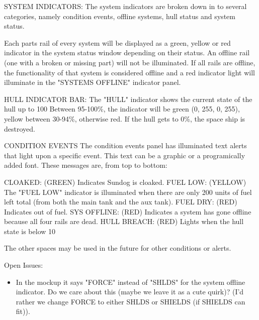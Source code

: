 \begin{itemize}
SYSTEM INDICATORS: 
The system indicators are broken down in to several categories, namely
condition events, offline systems, hull status and system status.

Each parts rail of every system will be displayed as a green, yellow or red
indicator in the system status window depending on their status.  An
offline rail (one with a broken or missing part) will not be illuminated.
If all rails are offline, the functionality of that system is considered
offline and a red indicator light will illuminate in the "SYSTEMS OFFLINE"
indicator panel.

HULL INDICATOR BAR:
The "HULL" indicator shows the current state of the hull up to 100%
Between 95-100\%, the indicator will be green (0, 255, 0, 255),
yellow between 30-94\%, otherwise red.  If the hull gets to 0\%, the
space ship is destroyed.  

CONDITION EVENTS
The condition events panel has illuminated text alerts that light upon a specific event. This text can be a graphic or a programically added font. These messages are, from top to bottom:

CLOAKED: (GREEN) Indicates Sundog is cloaked. 
FUEL LOW: (YELLOW) The "FUEL LOW" indicator is illuminated when there are only 200 units
of fuel left total (from both the main tank and the aux tank).
FUEL DRY: (RED) Indicates out of fuel. 
SYS OFFLINE: (RED) Indicates a system has gone offline because all four rails are dead. 
HULL BREACH: (RED) Lights when the hull state is below 10%

The other spaces may be used in the future for other conditions or alerts. 
 


Open Issues:
\begin{itemize}
\item In the mockup it says "FORCE" instead of "SHLDS" for the system
offline indicator.  Do we care about this (maybe we leave it as a cute
quirk)? (I'd rather we change FORCE to either SHLDS or SHIELDS (if SHIELDS can fit)). 
\end{itemize}


\end{itemize}
